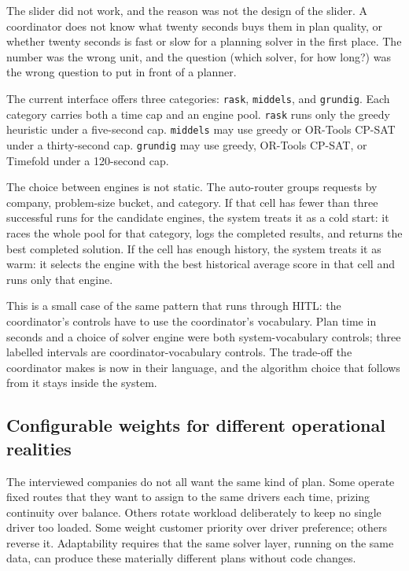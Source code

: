 The slider did not work, and the reason was not the design of the slider. A coordinator does not know what twenty seconds buys them in plan quality, or whether twenty seconds is fast or slow for a planning solver in the first place. The number was the wrong unit, and the question (which solver, for how long?) was the wrong question to put in front of a planner.

The current interface offers three categories: \texttt{rask}, \texttt{middels}, and \texttt{grundig}. Each category carries both a time cap and an engine pool. \texttt{rask} runs only the greedy heuristic under a five-second cap. \texttt{middels} may use greedy or OR-Tools CP-SAT under a thirty-second cap. \texttt{grundig} may use greedy, OR-Tools CP-SAT, or Timefold under a 120-second cap.

The choice between engines is not static. The auto-router groups requests by company, problem-size bucket, and category. If that cell has fewer than three successful runs for the candidate engines, the system treats it as a cold start: it races the whole pool for that category, logs the completed results, and returns the best completed solution. If the cell has enough history, the system treats it as warm: it selects the engine with the best historical average score in that cell and runs only that engine.

This is a small case of the same pattern that runs through HITL: the coordinator's controls have to use the coordinator's vocabulary. Plan time in seconds and a choice of solver engine were both system-vocabulary controls; three labelled intervals are coordinator-vocabulary controls. The trade-off the coordinator makes is now in their language, and the algorithm choice that follows from it stays inside the system.

\subsection{Configurable weights for different operational realities}
\label{sec:configurable-weights}

The interviewed companies do not all want the same kind of plan. Some operate fixed routes that they want to assign to the same drivers each time, prizing continuity over balance. Others rotate workload deliberately to keep no single driver too loaded. Some weight customer priority over driver preference; others reverse it. Adaptability requires that the same solver layer, running on the same data, can produce these materially different plans without code changes.

